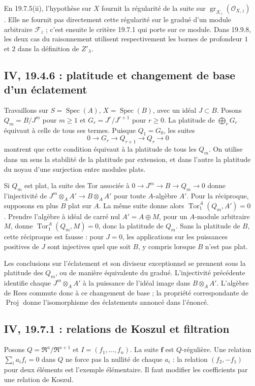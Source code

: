 \documentclass[11pt,a4paper]{article}
\begin{document}
En 19.7.5(ii), l'hypothèse sur $X$ fournit la régularité de la suite
sur $\operatorname{gr}_{\mathcal K_z}(\mathcal O_{X,z})$.
Elle ne fournit pas directement cette régularité sur le gradué
d'un module arbitraire $\mathcal F_z$ ; c'est ensuite le critère
19.7.1 qui porte sur ce module. Dans 19.9.8, les deux cas du
raisonnement utilisent respectivement les bornes de profondeur
$1$ et $2$ dans la définition de $Z'_\lambda$.

\subsection{IV, 19.4.6 : platitude et changement de base d’un éclatement}
\label{note:iv4-blowups}
Travaillons sur $S=\operatorname{Spec}(A)$, $X=\operatorname{Spec}(B)$,
avec un idéal $J\subset B$. Posons
$Q_m=B/J^m$ pour $m\geq1$ et $G_r=J^r/J^{r+1}$ pour $r\geq0$.
La platitude de $\bigoplus_rG_r$ équivaut à celle de tous ses termes.
Puisque $Q_1=G_0$, les suites
\[
 0\longrightarrow G_r\longrightarrow Q_{r+1}
   \longrightarrow Q_r\longrightarrow0
\]
montrent que cette condition équivaut à la platitude de tous les $Q_m$.
On utilise dans un sens la stabilité de la platitude par extension,
et dans l'autre la platitude du noyau d'une surjection entre modules plats.

Si $Q_m$ est plat, la suite des Tor associée à
$0\to J^m\to B\to Q_m\to0$ donne l'injectivité de
$J^m\otimes_A A'\to B\otimes_A A'$ pour toute $A$-algèbre $A'$.
Pour la réciproque, supposons en plus $B$ plat sur $A$.
La même suite donne alors $\operatorname{Tor}_1^A(Q_m,A')=0$.
Prendre l'algèbre à idéal de carré nul $A'=A\oplus M$, pour un
$A$-module arbitraire $M$, donne
$\operatorname{Tor}_1^A(Q_m,M)=0$, donc la platitude de $Q_m$.
Sans la platitude de $B$, cette réciproque est fausse : pour $J=0$,
les applications sur les puissances positives de $J$ sont injectives
quel que soit $B$, y compris lorsque $B$ n'est pas plat.

Les conclusions sur l'éclatement et son diviseur exceptionnel se
prennent sous la platitude des $Q_m$, ou de manière équivalente du
gradué. L'injectivité précédente identifie chaque $J^m\otimes_A A'$
à la puissance de l'idéal image dans $B\otimes_A A'$.
L'algèbre de Rees commute donc à ce changement de base ; la propriété
correspondante de $\operatorname{Proj}$ donne l'isomorphisme des
éclatements annoncé dans l'énoncé.

\subsection{IV, 19.7.1 : relations de Koszul et filtration}
\label{note:iv4-koszul}
Posons $Q=\mathfrak R^a/\mathfrak R^{a+1}$ et $I=(f_1,\ldots,f_n)$.
La suite $\mathbf f$ est $Q$-régulière. Une relation
$\sum_i a_if_i=0$ dans $Q$ ne force pas la nullité de chaque $a_i$ :
la relation $(f_2,-f_1)$ pour deux éléments est l'exemple élémentaire.
Il faut modifier les coefficients par une relation de Koszul.
\end{document}
